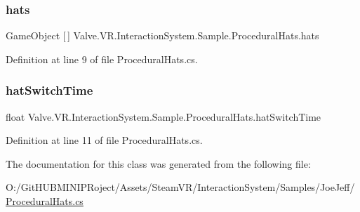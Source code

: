 \subsubsection{\texorpdfstring{hats}{hats}}
{\footnotesize\ttfamily Game\+Object \mbox{[}$\,$\mbox{]} Valve.\+V\+R.\+Interaction\+System.\+Sample.\+Procedural\+Hats.\+hats}



Definition at line 9 of file Procedural\+Hats.\+cs.

\mbox{\label{class_valve_1_1_v_r_1_1_interaction_system_1_1_sample_1_1_procedural_hats_abdce8dde269ca2193a7e9a95cfaddd02}} 
\subsubsection{\texorpdfstring{hatSwitchTime}{hatSwitchTime}}
{\footnotesize\ttfamily float Valve.\+V\+R.\+Interaction\+System.\+Sample.\+Procedural\+Hats.\+hat\+Switch\+Time}



Definition at line 11 of file Procedural\+Hats.\+cs.



The documentation for this class was generated from the following file\+:\begin{DoxyCompactItemize}
\item 
O\+:/\+Git\+H\+U\+B\+M\+I\+N\+I\+P\+Roject/\+Assets/\+Steam\+V\+R/\+Interaction\+System/\+Samples/\+Joe\+Jeff/\mbox{\hyperlink{_procedural_hats_8cs}{Procedural\+Hats.\+cs}}\end{DoxyCompactItemize}
